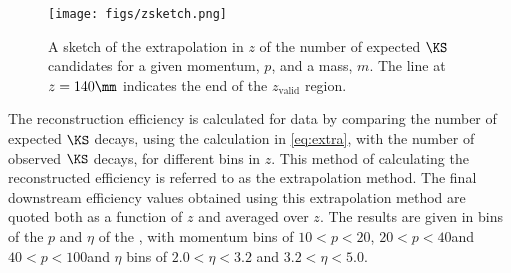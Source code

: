 \begin{figure}[h]
\centering
\texttt{[image: figs/zsketch.png]}
\caption{A sketch of the extrapolation in $z$ of the number of expected $\KS$ candidates for a given momentum, $p$, and a mass, $m$. The line at $z = 140\mm$ indicates the end of the $z_{\mathrm{valid}}$ region.}
\label{fig:sketch}
\end{figure}

The reconstruction efficiency is calculated for data by comparing the number of expected $\KS$ decays, using the calculation in \autoref{eq:extra}, with the number of observed $\KS$ decays, for different bins in $z$. This method of calculating the reconstructed efficiency is referred to as the extrapolation method. The final downstream efficiency values obtained using this extrapolation method are quoted both as a function of $z$ and averaged over $z$. The results are given in bins of the $p$ and $\eta$ of the \KS, with momentum bins of $10<p<20$\gevc, $20<p<40$\gevc and $40<p<100$\gevc and $\eta$ bins of $2.0<\eta<3.2$ and $3.2<\eta<5.0$.









